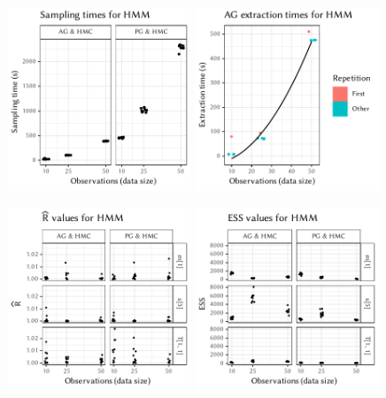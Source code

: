 \begin{figure}[p]
  \centering
  \includegraphics[width=0.49\textwidth]{figures/HMM-sampling_times}
  \includegraphics[width=0.49\textwidth]{figures/HMM-compile_times}
  \par
  \includegraphics[width=0.49\textwidth]{figures/HMM-rhat}
  \includegraphics[width=0.49\textwidth]{figures/HMM-ess}

\end{figure}
